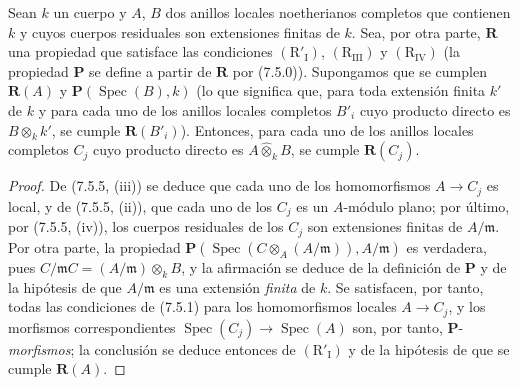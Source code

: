 \begin{proposition}[7.5.6]
\label{IV.2.s7.5.6-fr}
Sean $k$ un cuerpo y $A$, $B$ dos anillos locales noetherianos completos
que contienen $k$ y cuyos cuerpos residuales son extensiones finitas
de $k$. Sea, por otra parte, $\boldsymbol R$ una propiedad que satisface
las condiciones $(\mathrm R'_{\mathrm I})$,
$(\mathrm R_{\mathrm{III}})$ y $(\mathrm R_{\mathrm{IV}})$ \textup{(la propiedad
$\boldsymbol P$ se define a partir de $\boldsymbol R$ por (7.5.0))}.
Supongamos que se cumplen $\boldsymbol R(A)$ y
$\boldsymbol P(\operatorname{Spec}(B),k)$ \textup{(lo que significa que, para
toda extensión finita $k'$ de $k$ y para cada uno de los anillos locales
completos $B'_i$ cuyo producto directo es $B\otimes_k k'$, se cumple
$\boldsymbol R(B'_i)$)}. Entonces, para cada uno de los anillos locales
completos $C_j$ cuyo producto directo es $A\widehat\otimes_k B$,
se cumple $\boldsymbol R(C_j)$.
\end{proposition}

\begin{proof}
De (7.5.5, (iii)) se deduce que cada uno de los homomorfismos
$A\to C_j$ es local, y de (7.5.5, (ii)), que cada uno de los $C_j$ es
un $A$-módulo plano; por último, por (7.5.5, (iv)), los cuerpos
residuales de los $C_j$ son extensiones finitas de $A/\mathfrak m$.
Por otra parte, la propiedad
$\boldsymbol P(\operatorname{Spec}(C\otimes_A(A/\mathfrak m)),A/\mathfrak m)$
es verdadera, pues $C/\mathfrak mC=(A/\mathfrak m)\otimes_kB$, y la
afirmación se deduce de la definición de $\boldsymbol P$ y de la
hipótesis de que $A/\mathfrak m$ es una extensión \emph{finita} de $k$.
Se satisfacen, por tanto, todas las condiciones de (7.5.1) para los
homomorfismos locales $A\to C_j$, y los morfismos correspondientes
$\operatorname{Spec}(C_j)\to\operatorname{Spec}(A)$ son, por tanto,
$\boldsymbol P$-\emph{morfismos}; la conclusión se deduce entonces de
$(\mathrm R'_{\mathrm I})$ y de la hipótesis de que se cumple
$\boldsymbol R(A)$.
\end{proof}
